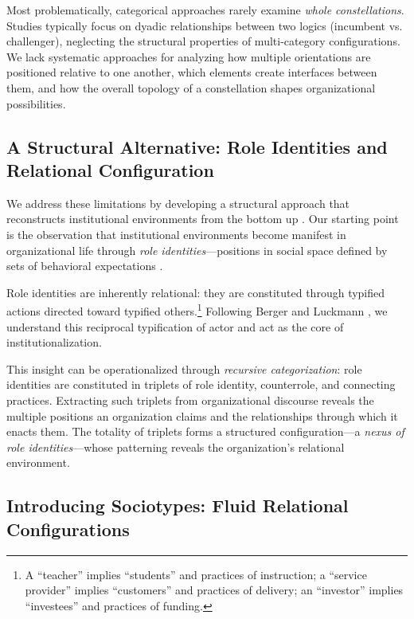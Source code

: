 \documentclass[../main.tex]{subfiles}
\begin{document}
Most problematically, categorical approaches rarely examine \textit{whole constellations}. Studies typically focus on dyadic relationships between two logics (incumbent vs. challenger), neglecting the structural properties of multi-category configurations. We lack systematic approaches for analyzing how multiple orientations are positioned relative to one another, which elements create interfaces between them, and how the overall topology of a constellation shapes organizational possibilities.

\subsection{A Structural Alternative: Role Identities and Relational Configuration}

We address these limitations by developing a structural approach that reconstructs institutional environments from the bottom up \cite{jancsary2017structural,powell2012microfoundations}. Our starting point is the observation that institutional environments become manifest in organizational life through \textit{role identities}---positions in social space defined by sets of behavioral expectations \cite{stryker1980symbolic}.

Role identities are inherently relational: they are constituted through typified actions directed toward typified others.\footnote{A ``teacher'' implies ``students'' and practices of instruction; a ``service provider'' implies ``customers'' and practices of delivery; an ``investor'' implies ``investees'' and practices of funding.} Following Berger and Luckmann \cite{berger1967social}, we understand this reciprocal typification of actor and act as the core of institutionalization.

This insight can be operationalized through \textit{recursive categorization}: role identities are constituted in triplets of role identity, counterrole, and connecting practices. Extracting such triplets from organizational discourse reveals the multiple positions an organization claims and the relationships through which it enacts them. The totality of triplets forms a structured configuration---a \textit{nexus of role identities}---whose patterning reveals the organization's relational environment.

\subsection{Introducing Sociotypes: Fluid Relational Configurations}
\end{document}
